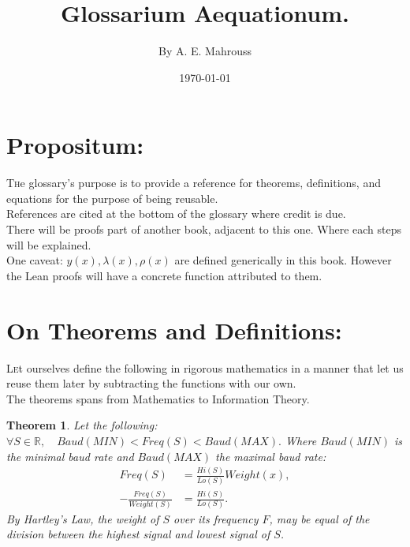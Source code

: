 \documentclass[10pt]{article}
\title{%
	\vspace{-1.5em}%
	\large\textbf{Glossarium Aequationum.}%
}
\author{By A. E. Mahrouss}
\date{\today}
\theoremstyle{plain}
\newtheorem{theorem}{Theorem}[section]
\theoremstyle{definition}
\theoremstyle{remark}
\begin{document}

\maketitle
\tableofcontents
\newpage

\section{Propositum:}

\lettrine[lines=2, lhang=0.1, loversize=0.2]{T}he glossary's purpose is to provide a reference for theorems, definitions, and equations for the purpose of being reusable.\\
References are cited at the bottom of the glossary where credit is due.\\
There will be proofs part of another book, adjacent to this one. Where each steps will be explained.\\
One caveat: $y(x), \lambda(x), \rho(x)$ are defined generically in this book. However the Lean proofs will have a concrete function attributed to them.

\section{On Theorems and Definitions:}

\lettrine[lines=2, lhang=0.1, loversize=0.2]{L}et ourselves define the following in rigorous mathematics in a manner that let us reuse them later by subtracting the functions with our own.\\
The theorems spans from Mathematics to Information Theory. 

\begin{theorem}
Let the following:
$\forall S \in \mathbb{R}, \quad Baud(MIN) < Freq(S) < Baud(MAX).$ Where $Baud(MIN)$ is the minimal baud rate and $Baud(MAX)$ the maximal baud rate:
\begin{align*}
	Freq(S) &= \frac{Hi(S)}{Lo(S)} Weight(x),\\
	-\frac{Freq(S)}{Weight(S)} &= \frac{Hi(S)}{Lo(S)}.
\end{align*}
By Hartley's Law, the weight of $S$ over its frequency $F$, may be equal of the division between the highest signal and lowest signal of $S$.
\end{theorem}
\end{document}
